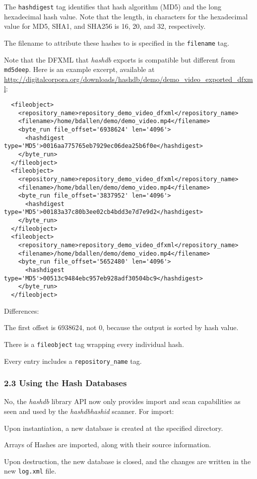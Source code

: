 \documentclass[12pt,twoside]{article}
\newcommand{\hdb}{\emph{hashdb}\xspace}
\newcommand{\hid}{\emph{hashid}\xspace}
\begin{document}
The \texttt{hashdigest} tag identifies that hash algorithm (MD5)
and the long hexadecimal hash value.
Note that the length, in characters for the hexadecimal value
for MD5, SHA1, and SHA256 is 16, 20, and 32, respectively.

The filename to attribute these hashes to is specified in the \texttt{filename}
tag.

Note that the DFXML that \hdb exports is compatible
but different from \texttt{md5deep}.
Here is an example excerpt, available at
\url{http://digitalcorpora.org/downloads/hashdb/demo/demo\_video\_exported\_dfxml}:

\begin{verbatim}
  <fileobject>
    <repository_name>repository_demo_video_dfxml</repository_name>
    <filename>/home/bdallen/demo/demo_video.mp4</filename>
    <byte_run file_offset='6938624' len='4096'>
      <hashdigest type='MD5'>0016aa775765eb7929ec06dea25b6f0e</hashdigest>
    </byte_run>
  </fileobject>
  <fileobject>
    <repository_name>repository_demo_video_dfxml</repository_name>
    <filename>/home/bdallen/demo/demo_video.mp4</filename>
    <byte_run file_offset='3837952' len='4096'>
      <hashdigest type='MD5'>00183a37c80b3ee02cb4bdd3e7d7e9d2</hashdigest>
    </byte_run>
  </fileobject>
  <fileobject>
    <repository_name>repository_demo_video_dfxml</repository_name>
    <filename>/home/bdallen/demo/demo_video.mp4</filename>
    <byte_run file_offset='5652480' len='4096'>
      <hashdigest type='MD5'>00513c9484ebc957eb928adf30504bc9</hashdigest>
    </byte_run>
  </fileobject>
\end{verbatim}
Differences:
\begin{compactenum}
\item The first offset is 6938624, not 0,
because the output is sorted by hash value. 
\item There is a \texttt{fileobject} tag wrapping every individual hash.
\item Every entry includes a \texttt{repository\_name} tag.
\end{compactenum}

\subsubsection*{2.3 Using the Hash Databases}
No, the \hdb library API now only provides import and scan capabilities
as seen and used by the \hdb \hid scanner.
For import:
\begin{compactitem}
\item Upon instantiation, a new database is created at the specified directory.
\item Arrays of Hashes are imported, along with their source information.
\item Upon destruction, the new database is closed, and the changes
are written in the new \texttt{log.xml} file.
\end{compactitem}
\end{document}
